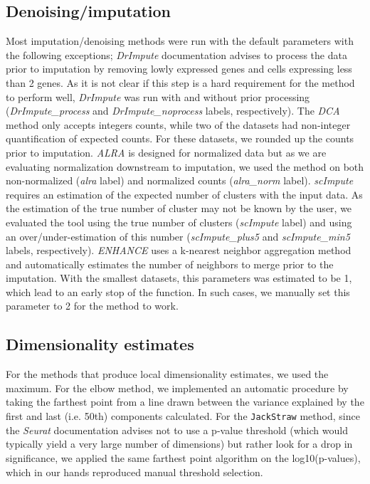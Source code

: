 \documentclass{bmcart}
\begin{document}
\subsection*{Denoising/imputation}
Most imputation/denoising methods were run with the default parameters with the following exceptions; \textit{DrImpute} documentation advises to process the data prior to imputation by removing lowly expressed genes and cells expressing less than 2 genes. As it is not clear if this step is a hard requirement for the method to perform well, \textit{DrImpute} was run with and without prior processing (\textit{DrImpute\_process} and \textit{DrImpute\_noprocess} labels, respectively). The \textit{DCA} method only accepts integers counts, while two of the datasets had non-integer quantification of expected counts. For these datasets, we rounded up the counts prior to imputation. \textit{ALRA} is designed for normalized data but as we are evaluating normalization downstream to imputation, we used the method on both non-normalized (\textit{alra} label) and normalized counts (\textit{alra\_norm} label). \textit{scImpute} requires an estimation of the expected number of clusters with the input data. As the estimation of the true number of cluster may not be known by the user, we evaluated the tool using the true number of clusters (\textit{scImpute} label) and using an over/under-estimation of this number (\textit{scImpute\_plus5} and \textit{scImpute\_min5} labels, respectively). \textit{ENHANCE} uses a k-nearest neighbor aggregation method and automatically estimates the number of neighbors to merge prior to the imputation. With the smallest datasets, this parameters was estimated to be 1, which lead to an early stop of the function. In such cases, we manually set this parameter to 2 for the method to work. 

\subsection*{Dimensionality estimates}

For the methods that produce local dimensionality estimates, we used the maximum. For the elbow method, we implemented an automatic procedure by taking the farthest point from a line drawn between the variance explained by the first and last (i.e. 50th) components calculated. For the \texttt{JackStraw} method, since the \textit{Seurat} documentation advises not to use a p-value threshold (which would typically yield a very large number of dimensions) but rather look for a drop in significance, we applied the same farthest point algorithm on the log10(p-values), which in our hands reproduced manual threshold selection.
\end{document}
